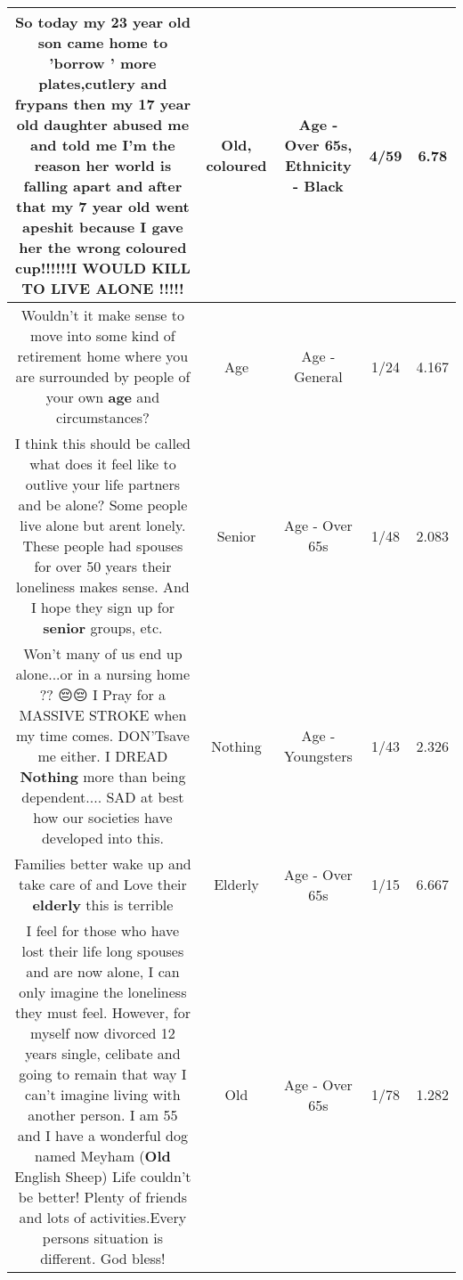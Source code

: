 \documentclass[11pt]{article}
\newlength\mylength
\begin{document}
\begin{center}
\begin{longtable}{|C{.65\mylength}|C{.30\mylength}|C{.12\mylength}|C{.12\mylength}|C{.12\mylength}|}
  \small So today my 23 year \textbf{old} son came home to 'borrow ' more plates,cutlery and frypans then my 17 year \textbf{old} daughter abused me and told me I'm the reason her world is falling apart and after that my 7 year \textbf{old} went apeshit because I gave her the wrong \textbf{coloured} cup!!!!!!I WOULD KILL TO LIVE ALONE !!!!!\normalsize   & Old, coloured & Age - Over 65s, Ethnicity - Black & 4/59 & 6.78 \\  \hline
  \small Wouldn't it make sense to move into some kind of retirement home where you are surrounded by people of your own \textbf{age} and circumstances?\normalsize   & Age & Age - General & 1/24 & 4.167 \\  \hline
  \small I think this should be called  what does it feel like to outlive your life partners and be alone? Some people live alone but arent lonely. These people had spouses for over 50 years their loneliness makes sense. And I hope they sign up for \textbf{senior} groups, etc.\normalsize   & Senior & Age - Over 65s & 1/48 & 2.083 \\  \hline
  \small Won't many of us end up alone...or in a nursing home ??  😔😔 I  Pray for a  MASSIVE  STROKE when my time comes. DON'Tsave me either.  I  DREAD \textbf{Nothing} more than being dependent.... SAD at best how our societies have developed into this.\normalsize   & Nothing & Age - Youngsters & 1/43 & 2.326 \\  \hline
  \small Families better wake up and take care of and Love their \textbf{elderly} this is terrible\normalsize   & Elderly & Age - Over 65s & 1/15 & 6.667 \\  \hline
  \small I feel for those who have lost their life long spouses and are now alone, I can only imagine the loneliness they must feel. However, for myself now divorced 12 years single, celibate and going to remain that way I can't imagine living with another person. I am 55 and I have a wonderful dog named Meyham (\textbf{Old} English Sheep) Life couldn't be better! Plenty of friends and lots of activities.Every persons situation is different. God bless!\normalsize   & Old & Age - Over 65s & 1/78 & 1.282 \\  \hline

\end{longtable}
\end{center}
\end{document}
